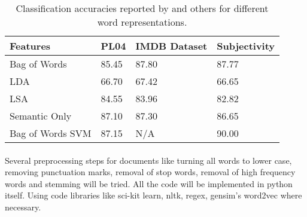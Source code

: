 \documentclass[11pt, oneside]{article}
\begin{document}
\begin{table}[H]
\begin{tabular}{ | l | p{1.5cm} | p{3cm} | p{3cm} |  }
 \hline
 \textbf{Features} & \textbf{PL04} & \textbf{IMDB Dataset} & \textbf{Subjectivity} \\
 \hline
 Bag of Words   & 85.45 & 87.80 & 87.77 \\
 LDA & 66.70 & 67.42 & 66.65 \\
 LSA & 84.55 & 83.96 & 82.82 \\
 Semantic Only & 87.10 & 87.30 & 86.65 \\
 Bag of Words SVM \cite{pang2004sentimental} & 87.15 & N/A & 90.00 \\
 \hline
\end{tabular}
\caption{Classification accuracies reported by \cite{maas2011learning} and others for different word representations.}
\label{table:1}
\end{table}

\paragraph{}
Several preprocessing steps for documents like turning all words to lower case, removing punctuation marks, removal of stop words, removal of high frequency words and stemming will be tried. All the code will be implemented in python itself. Using code libraries like sci-kit learn, nltk, regex, gensim’s word2vec where necessary.


\end{document}
